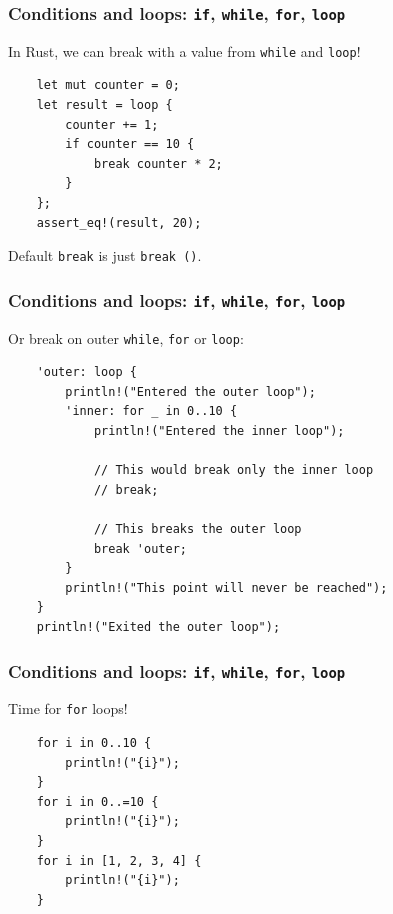 \documentclass[aspectratio=1610,t]{beamer}
\begin{document}

\begin{frame}[fragile]
\frametitle{Conditions and loops: \texttt{if}, \texttt{while}, \texttt{for}, \texttt{loop}}
In Rust, we can break with a value from \texttt{while} and \texttt{loop}!

\begin{verbatim}
    let mut counter = 0;
    let result = loop {
        counter += 1;
        if counter == 10 {
            break counter * 2;
        }
    };
    assert_eq!(result, 20);
\end{verbatim}

Default \texttt{break} is just \texttt{break ()}.
\end{frame}


\begin{frame}[fragile]
\frametitle{Conditions and loops: \texttt{if}, \texttt{while}, \texttt{for}, \texttt{loop}}
Or break on outer \texttt{while}, \texttt{for} or \texttt{loop}:

\begin{verbatim}
    'outer: loop {
        println!("Entered the outer loop");
        'inner: for _ in 0..10 {
            println!("Entered the inner loop");

            // This would break only the inner loop
            // break;

            // This breaks the outer loop
            break 'outer;
        }
        println!("This point will never be reached");
    }
    println!("Exited the outer loop");
\end{verbatim}
\end{frame}


\begin{frame}[fragile]
\frametitle{Conditions and loops: \texttt{if}, \texttt{while}, \texttt{for}, \texttt{loop}}
Time for \texttt{for} loops!

\begin{verbatim}
    for i in 0..10 {
        println!("{i}");
    }
    for i in 0..=10 {
        println!("{i}");
    }
    for i in [1, 2, 3, 4] {
        println!("{i}");
    }
\end{verbatim}
\end{frame}
\end{document}
